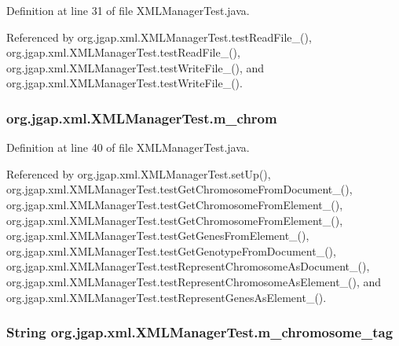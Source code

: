 Definition at line 31 of file X\-M\-L\-Manager\-Test.\-java.



Referenced by org.\-jgap.\-xml.\-X\-M\-L\-Manager\-Test.\-test\-Read\-File\-\_(), org.\-jgap.\-xml.\-X\-M\-L\-Manager\-Test.\-test\-Read\-File\-\_(), org.\-jgap.\-xml.\-X\-M\-L\-Manager\-Test.\-test\-Write\-File\-\_(), and org.\-jgap.\-xml.\-X\-M\-L\-Manager\-Test.\-test\-Write\-File\-\_().

\hypertarget{classorg_1_1jgap_1_1xml_1_1_x_m_l_manager_test_ae232c3ed4934a2bb7f113bfdc67af5bc}{
\subsubsection[{m\-\_\-chrom}]{ org.\-jgap.\-xml.\-X\-M\-L\-Manager\-Test.\-m\-\_\-chrom\hspace{0.3cm}{\ttfamily [private]}}}\label{classorg_1_1jgap_1_1xml_1_1_x_m_l_manager_test_ae232c3ed4934a2bb7f113bfdc67af5bc}


Definition at line 40 of file X\-M\-L\-Manager\-Test.\-java.



Referenced by org.\-jgap.\-xml.\-X\-M\-L\-Manager\-Test.\-set\-Up(), org.\-jgap.\-xml.\-X\-M\-L\-Manager\-Test.\-test\-Get\-Chromosome\-From\-Document\-\_(), org.\-jgap.\-xml.\-X\-M\-L\-Manager\-Test.\-test\-Get\-Chromosome\-From\-Element\-\_(), org.\-jgap.\-xml.\-X\-M\-L\-Manager\-Test.\-test\-Get\-Chromosome\-From\-Element\-\_(), org.\-jgap.\-xml.\-X\-M\-L\-Manager\-Test.\-test\-Get\-Genes\-From\-Element\-\_(), org.\-jgap.\-xml.\-X\-M\-L\-Manager\-Test.\-test\-Get\-Genotype\-From\-Document\-\_(), org.\-jgap.\-xml.\-X\-M\-L\-Manager\-Test.\-test\-Represent\-Chromosome\-As\-Document\-\_(), org.\-jgap.\-xml.\-X\-M\-L\-Manager\-Test.\-test\-Represent\-Chromosome\-As\-Element\-\_(), and org.\-jgap.\-xml.\-X\-M\-L\-Manager\-Test.\-test\-Represent\-Genes\-As\-Element\-\_().

\hypertarget{classorg_1_1jgap_1_1xml_1_1_x_m_l_manager_test_a7d25b2f9badfb495c679528cb906f44c}{
\subsubsection[{m\-\_\-chromosome\-\_\-tag}]{\setlength{\rightskip}{0pt plus 5cm}String org.\-jgap.\-xml.\-X\-M\-L\-Manager\-Test.\-m\-\_\-chromosome\-\_\-tag\hspace{0.3cm}{\ttfamily [private]}}}\label{classorg_1_1jgap_1_1xml_1_1_x_m_l_manager_test_a7d25b2f9badfb495c679528cb906f44c}


